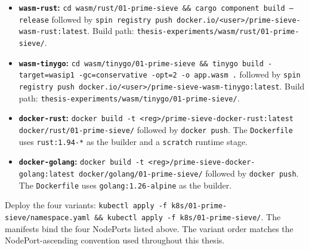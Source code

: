 \begin{itemize}
    \item \begin{sloppypar}\textbf{\texttt{wasm-rust}:} \texttt{cd wasm/rust/01-prime-sieve \&\& cargo component build --release} followed by \texttt{spin registry push docker.io/<user>/prime-sieve-wasm-rust:latest}. Build path: \texttt{thesis-experiments/wasm/rust/01-prime-sieve/}.\end{sloppypar}
    \item \begin{sloppypar}\textbf{\texttt{wasm-tinygo}:} \texttt{cd wasm/tinygo/01-prime-sieve \&\& tinygo build -target=wasip1 -gc=conservative -opt=2 -o app.wasm .} followed by \texttt{spin registry push docker.io/<user>/prime-sieve-wasm-tinygo:latest}. Build path: \texttt{thesis-experiments/wasm/tinygo/01-prime-sieve/}.\end{sloppypar}
    \item \begin{sloppypar}\textbf{\texttt{docker-rust}:} \texttt{docker build -t <reg>/prime-sieve-docker-rust:latest docker/rust/01-prime-sieve/} followed by \texttt{docker push}. The \texttt{Dockerfile} uses \texttt{rust:1.94-*} as the builder and a \texttt{scratch} runtime stage.\end{sloppypar}
    \item \begin{sloppypar}\textbf{\texttt{docker-golang}:} \texttt{docker build -t <reg>/prime-sieve-docker-golang:latest docker/golang/01-prime-sieve/} followed by \texttt{docker push}. The \texttt{Dockerfile} uses \texttt{golang:1.26-alpine} as the builder.\end{sloppypar}
\end{itemize}

\begin{sloppypar}
Deploy the four variants: \texttt{kubectl apply -f k8s/01-prime-sieve/namespace.yaml \&\& kubectl apply -f k8s/01-prime-sieve/}. The manifests bind the four NodePorts listed above. The variant order matches the NodePort-ascending convention used throughout this thesis.
\end{sloppypar}

